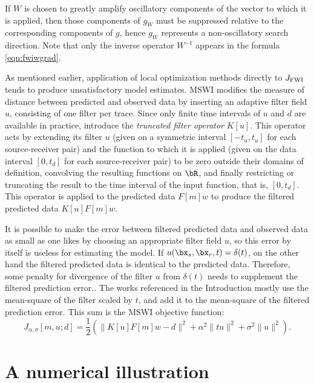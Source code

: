 If $W$ is chosen to greatly
amplify oscillatory components of the vector to which it is applied,
then those components of $g_W$ must be suppressed relative to the
corresponding components of $g$, hence $g_W$ represents a
non-oscillatory search direction. Note that only the inverse operator
$W^{-1}$ appears in the formula \ref{eqn:fwiwgrad}.

As mentioned earlier, application of local optimization methods
directly to $J_{\rm FWI}$ tends to produce unsatisfactory model
estimates. MSWI modifies the measure of distance between predicted and
observed data by inserting an adaptive filter field $u$, consisting of
one filter per trace. Since only finite time intervals of $u$ and $d$ are available in
practice, introduce the {\em truncated filter operator} $K[u]$. This
operator acts by extending its filter $u$ (given on a symmetric
interval $[-t_u,t_u]$ for each source-receiver pair) and the function to which
it is applied (given on the data interval $[0,t_d]$ for each
source-receiver pair) to be zero outside their domains of definition, convolving the
resulting functions on $\bR$, and finally restricting or truncating
the result to the time interval of the input function, that is,
$[0,t_d]$. This operator is applied to the predicted data $F[m]w$ to
produce the filtered predicted data $K[u]F[m]w$.

It is possible to make the error between filtered predicted data and
observed data as small as one likes by choosing an appropriate filter
field $u$, so this error by itself is useless for estimating the
model. If $u(\bx_s,\bx_r,t)=\delta(t)$, on the other hand the filtered
predicted data is identical to the predicted data.
Therefore, some penalty for divergence of the filter $u$ from
$\delta(t)$ needs to supplement the filtered prediction error.. The works referenced in the Introduction mostly use the
mean-square of the filter scaled by $t$, and add it to the mean-square
of the filtered prediction error. This sum is the MSWI objective function:
\begin{equation}
  \label{eqn:filtpen}
  J_{\alpha,\sigma}[m,u;d]=\frac{1}{2}(\|K[u]F[m]w-d\|^2
  +\alpha^2\|tu\|^2 + \sigma^2\|u\|^2).
\end{equation}


\section{A numerical illustration}


